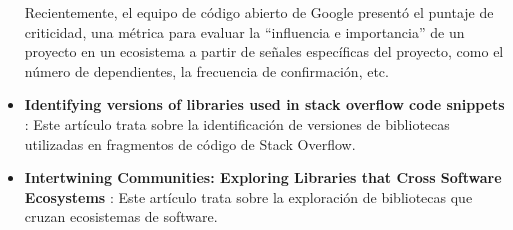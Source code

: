 \begin{itemize}
          Recientemente, el equipo de código abierto de Google presentó el puntaje de criticidad, una métrica para evaluar la
          “influencia e importancia” de un proyecto en un ecosistema a partir de señales específicas del proyecto, como el número
          de dependientes, la frecuencia de confirmación, etc.
    \item \textbf{Identifying versions of libraries used in stack overflow code snippets} \cite{zerouali2021identifying}:
          Este artículo trata sobre la identificación de versiones de bibliotecas utilizadas en fragmentos de código de Stack Overflow.
    \item \textbf{Intertwining Communities: Exploring Libraries that Cross Software Ecosystems} \cite{kannee2023intertwining}:
          Este artículo trata sobre la exploración de bibliotecas que cruzan ecosistemas de software.
\end{itemize}